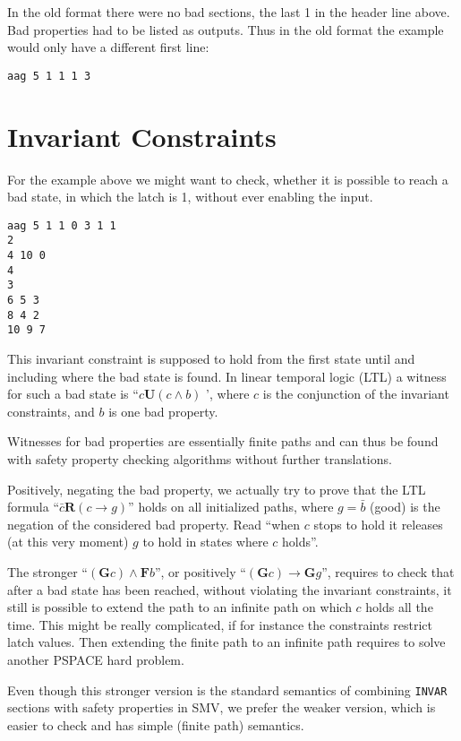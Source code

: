 \documentclass{llncs}
\begin{document}
In the old format there were no bad sections, the last 1 in the header line
above.  Bad properties had to be listed as outputs.  Thus in the old format
the example would only have a different first line:
{\small
\begin{verbatim}
aag 5 1 1 1 3
\end{verbatim}}

\section{Invariant Constraints}

For the example above we might want to check, whether it is possible to reach
a bad state, in which the latch is 1, without ever enabling the input.
{\small
\begin{verbatim}
aag 5 1 1 0 3 1 1
2
4 10 0
4
3
6 5 3
8 4 2
10 9 7
\end{verbatim}}
This invariant constraint is supposed to hold from the first state
until and including where the bad state is found.  In linear temporal logic
(LTL) a witness for such a bad state is 
``$ \mathit{c} \mathrel{\mathbf{U}} (c \wedge b) $ ',
where $c$ is the conjunction of the invariant constraints, and $b$ is
one bad property.  

Witnesses for bad properties are essentially finite paths
and can thus be found with safety property checking algorithms without
further translations.

Positively, negating the bad property, we actually try to prove that the LTL
formula ``$ \mathit{\bar c} \mathrel{\mathbf{R}} (c \to g) $'' holds on
all initialized paths, where $g = \bar b$ (good) is the negation of the
considered bad property.  Read ``when $c$ stops to hold it releases
(at this very moment) $g$ to hold in states where $c$ holds''.

The stronger ``$(\mathrel{\mathbf{G}} c) \wedge \mathrel{\mathbf{F}}b$'',
or positively ``$(\mathrel{\mathbf{G}} c) \to \mathrel{\mathbf{G}}g$'',
requires to check that after a bad state has been
reached, without violating the invariant constraints, it still is possible
to extend the path to an infinite path on which $c$ holds all the time.
This might be really complicated, if for instance the constraints restrict
latch values.  Then extending the finite path to an infinite path requires
to solve another PSPACE hard problem.

Even though this stronger version is the standard semantics of combining
\texttt{INVAR} sections with safety properties in SMV, we prefer the weaker
version, which is easier to check and has simple (finite path) semantics.
\end{document}
